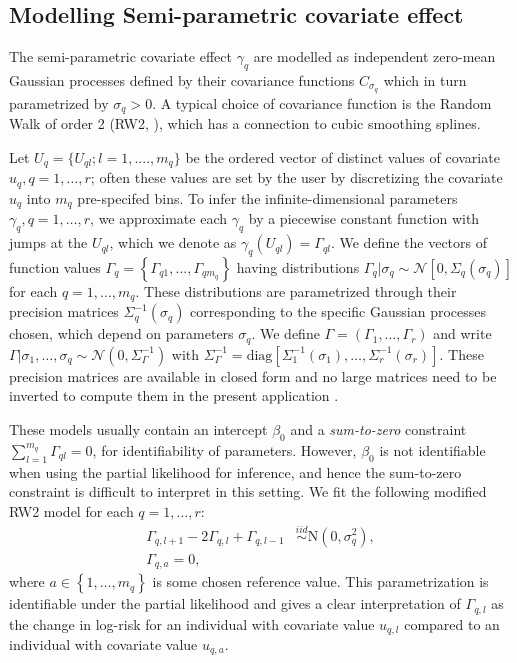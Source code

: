 \documentclass[ba]{imsart}
\begin{document}
\subsection{Modelling Semi-parametric covariate effect}\label{subsec:smooth}
The semi-parametric covariate effect $\gamma_q$ are modelled as independent zero-mean Gaussian processes defined by their covariance functions $C_{\sigma_{q}}$ which in turn parametrized by $\sigma_q > 0$. A typical choice
of covariance function is the Random Walk of order 2 (RW2, \citet{rw2}), which has a connection to cubic smoothing splines.

Let $U_{q} = \{U_{ql};l = 1, ...., m_q\}$ be the ordered vector of distinct values of covariate $u_q,q = 1,\ldots,r$; often these values are set by the user by discretizing the covariate $u_q$ into $m_q$ pre-specifed bins. To infer the infinite-dimensional parameters $\gamma_{q},q = 1,\ldots,r$, we approximate each $\gamma_q$ by a piecewise constant function with jumps at the $U_{ql}$, which we denote as $\gamma_{q}(U_{ql}) = \Gamma_{ql}$. We define the vectors of function values $\Gamma_{q} = \left\{ \Gamma_{q1},\ldots,\Gamma_{qm_{q}}\right\}$ having distributions $\Gamma_{q}|\sigma_{q}\sim\mathcal{N}\left[ 0,\Sigma_{q}(\sigma_{q})\right]$ for each $q = 1,\ldots,m_{q}$. These distributions are parametrized through their precision matrices $\Sigma_{q}^{-1}(\sigma_{q})$ corresponding to the specific Gaussian processes chosen, which depend on parameters $\sigma_{q}$. We define $\Gamma = (\Gamma_{1},\ldots,\Gamma_{r})$ and write $\Gamma|\sigma_{1},\ldots,\sigma_{q}\sim\mathcal{N}\left( 0,\Sigma^{-1}_{\Gamma}\right)$ with $\Sigma^{-1}_{\Gamma} = \text{diag}\left[ \Sigma_{1}^{-1}(\sigma_{1}),\ldots,\Sigma_{r}^{-1}(\sigma_{r})\right]$. These precision matrices are available in closed form and no large matrices need to be inverted to compute them in the present application \citep{rw2}.

These models usually contain an intercept $\beta_{0}$ and a \emph{sum-to-zero} constraint $\sum_{l=1}^{m_q}\Gamma_{ql} = 0$, for identifiability of parameters. However, $\beta_{0}$ is not identifiable when using the partial likelihood for inference, and hence the sum-to-zero constraint is difficult to interpret in this setting. We fit the following modified RW2 model for each $q = 1,\ldots,r$:
\begin{equation}\begin{aligned}\label{eqn:rw2}
\Gamma_{q,l+1} - 2\Gamma_{q,l} + \Gamma_{q,l-1} &\overset{iid}{\sim}\text{N}\left( 0,\sigma^{2}_{q}\right), \\
\Gamma_{q,a} = 0,
\end{aligned}\end{equation}
where $a\in\left\lbrace 1,\ldots,m_{q}\right\rbrace$ is some chosen reference value. This parametrization is identifiable under the partial likelihood and gives a clear interpretation of $\Gamma_{q,l}$ as the change in log-risk for an individual with covariate value $u_{q,l}$ compared to an individual with covariate value $u_{q,a}$. 
\end{document}
